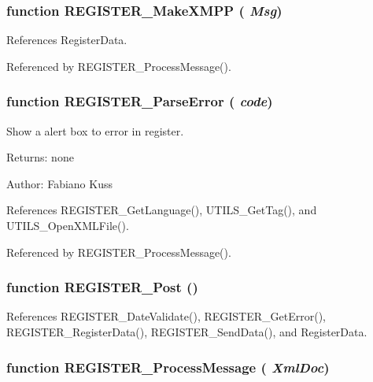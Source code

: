 \subsubsection[REGISTER\_\-MakeXMPP]{\setlength{\rightskip}{0pt plus 5cm}function REGISTER\_\-MakeXMPP ( {\em Msg})}\label{register_8js_7b297505aaea7ef445a5979ad8445a6c}




References RegisterData.

Referenced by REGISTER\_\-ProcessMessage().
\subsubsection[REGISTER\_\-ParseError]{\setlength{\rightskip}{0pt plus 5cm}function REGISTER\_\-ParseError ( {\em code})}\label{register_8js_a9961667728099b1c4c97a1c5ee778be}


Show a alert box to error in register. 

\begin{Desc}
\item[Returns:]none \end{Desc}
\begin{Desc}
\item[Author:]Fabiano Kuss \end{Desc}


References REGISTER\_\-GetLanguage(), UTILS\_\-GetTag(), and UTILS\_\-OpenXMLFile().

Referenced by REGISTER\_\-ProcessMessage().
\subsubsection[REGISTER\_\-Post]{\setlength{\rightskip}{0pt plus 5cm}function REGISTER\_\-Post ()}\label{register_8js_8d73a5840a1e6955fc6b61e824d60709}




References REGISTER\_\-DateValidate(), REGISTER\_\-GetError(), REGISTER\_\-RegisterData(), REGISTER\_\-SendData(), and RegisterData.
\subsubsection[REGISTER\_\-ProcessMessage]{\setlength{\rightskip}{0pt plus 5cm}function REGISTER\_\-ProcessMessage ( {\em XmlDoc})}\label{register_8js_071c2098a32807d7c980d9b42d35f2c8}


